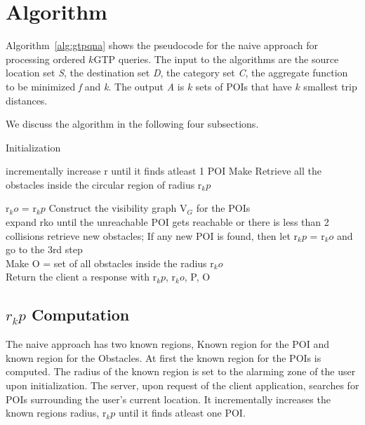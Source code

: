 \section{Algorithm}
\label{naivealgo}

Algorithm~\ref{alg:gtpqna} shows the pseudocode for the naive approach for processing ordered $k$GTP queries. The input to the algorithms are the source location set \textit{S}, the destination set \textit{D}, the category set \textit{C}, the aggregate function to be minimized \textit{f} and \textit{k}. The output \textit{A} is $k$ sets of POIs that have $k$ smallest trip distances.

\vspace*{8pt}
We discuss the algorithm in the following four subsections. 

\begin{algorithm}
\caption{Initialization}
\label{Init}
\begin{algorithmic}[1]
\STATE incrementally increase r until it finds atleast 1 POI
\STATE Make
\STATE Retrieve all the obstacles inside the circular region of radius r$_kp$

\STATE r$_ko$ = r$_kp$
\STATE Construct the visibility graph V$_G$ for the POIs
\\ 
\State expand rko  until the unreachable POI gets reachable or there is less than 2 collisions
\State retrieve new obstacles;
\State If any new POI is found, then let r$_kp$ = r$_ko$ and go to the 3rd step
\EndWhile
\\Make O = {set of all obstacles inside the radius r$_ko$}
\\Return the client a response with  r$_kp$, r$_ko$, P, O 


\EndProcedure
\end{algorithmic}
\end{algorithm}





\subsection{$r_kp$ Computation}

The naive approach has two known regions, Known region for the POI and known region for the Obstacles. At first the known region for the POIs is computed. The radius of the known region is set to the alarming zone of the user upon initialization. The server, upon request of the client application, searches for POIs surrounding the user's current location. It incrementally increases the known regions radius, r$_kp$ until it finds atleast one POI. \\
